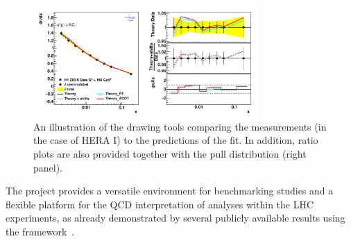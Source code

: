 \begin{description}
\begin{figure}[!ht]
   \centering
   \includegraphics[width=8.6cm]{datatheory.pdf}
   \caption{An illustration of the \fitter drawing tools comparing the measurements (in the case of HERA I) to the predictions of the fit. In addition, ratio plots are also provided together with the pull distribution (right panel).} 
 \label{fig:data}
\end{figure}

\end{description}
%


The \fitter project provides a versatile environment for benchmarking studies 
and a flexible platform for the QCD interpretation of analyses within the LHC experiments,
as already demonstrated by several publicly available results using the \fitter framework~\cite{atlas:strange,atlas:jets,atlas:hm,cms:strange,cms:jets,h1:2012kk,h1zeus:charm}.  
